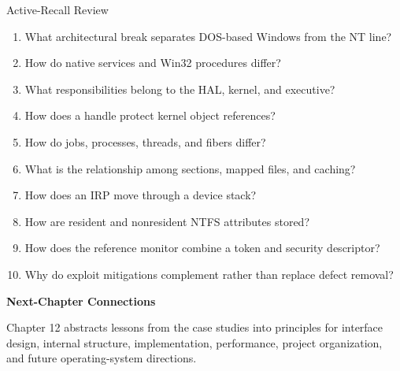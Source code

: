 \documentclass[10pt,letterpaper]{article}
\begin{document}
\enlargethispage{2\baselineskip}
\begin{studybox}{Active-Recall Review}
\small
\begin{enumerate}
  \item What architectural break separates DOS-based Windows from the NT line?
  \item How do native services and Win32 procedures differ?
  \item What responsibilities belong to the HAL, kernel, and executive?
  \item How does a handle protect kernel object references?
  \item How do jobs, processes, threads, and fibers differ?
  \item What is the relationship among sections, mapped files, and caching?
  \item How does an IRP move through a device stack?
  \item How are resident and nonresident NTFS attributes stored?
  \item How does the reference monitor combine a token and security descriptor?
  \item Why do exploit mitigations complement rather than replace defect removal?
\end{enumerate}
\end{studybox}

\par\medskip
{\color{navy}\bfseries Next-Chapter Connections}\par\smallskip
Chapter 12 abstracts lessons from the case studies into principles for interface design, internal structure, implementation, performance, project organization, and future operating-system directions.
\normalsize
\end{document}
